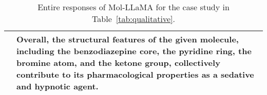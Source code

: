 \begin{table*}[ht!]
\begin{tabular}{p{1.7cm} p{14.5cm}}
& Overall, the structural features of the given molecule, including the benzodiazepine core, the pyridine ring, the bromine atom, and the ketone group, collectively contribute to its pharmacological properties as a sedative and hypnotic agent.\\
\bottomrule
\end{tabular}
\vspace{-0.1in}
\caption{Entire responses of Mol-LLaMA for the case study in Table~\ref{tab:qualitative}.}
\vspace{-0.2in}
\label{tab:qualitative_full_part1}
\end{table*}
